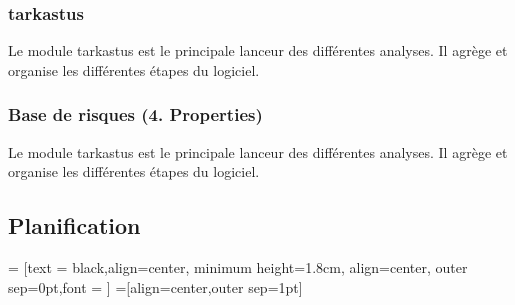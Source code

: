 \documentclass[10pt,a4paper]{article}
\begin{document}
\subsubsection{tarkastus}
Le module tarkastus est le principale lanceur des différentes analyses. Il agrège et organise les différentes étapes du logiciel.

\subsubsection{Base de risques (4. Properties)}
Le module tarkastus est le principale lanceur des différentes analyses. Il agrège et organise les différentes étapes du logiciel.

\subsection{Planification}
 = [text = black,align=center, minimum height=1.8cm, align=center, outer sep=0pt,font = \footnotesize]
 =[align=center,outer sep=1pt]
\end{document}
